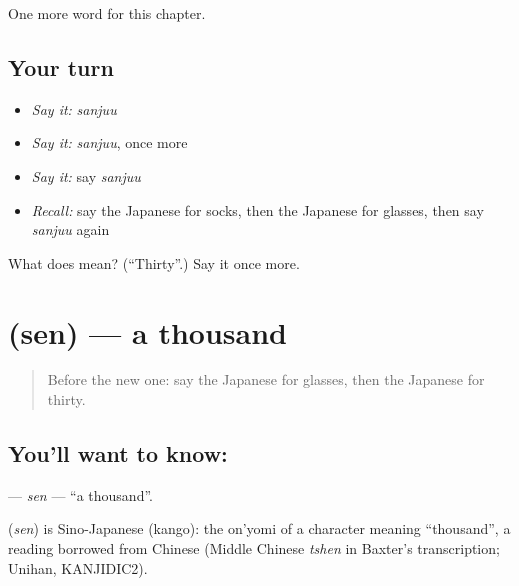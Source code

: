 \begin{grammarlens}[title={What you've built}]
One more word for this chapter.
\end{grammarlens}

\subsection*{Your turn}
\begin{itemize}
\raggedright
  \item \emph{Say it:} \emph{sanjuu}
  \item \emph{Say it:} \emph{sanjuu}, once more
  \item \emph{Say it:} say \emph{sanjuu}
  \item \emph{Recall:} say the Japanese for socks, then the Japanese for glasses, then say \emph{sanjuu} again
\end{itemize}

\begin{tcolorbox}[breakable,colback=teal!4,colframe=teal!35!black,title={Before you move on}]
What does  mean? (\textquotedblleft{}Thirty\textquotedblright{}.) Say it once more.
\end{tcolorbox}
\section[\texorpdfstring{\ja{せん} (sen)}{せん (sen)}]{ (sen) — a thousand}

\label{lesson:JA-C59-sen}



\begin{quote}
Before the new one: say the Japanese for glasses, then the Japanese for thirty.
\end{quote}

\subsection*{You'll want to know: }
\textbf{} — \emph{sen} — \textquotedblleft{}a thousand\textquotedblright{}.

\begin{cousinweb}
\textbf{} (\emph{sen}) is Sino-Japanese (kango): the on'yomi of a character meaning \textquotedblleft{}thousand\textquotedblright{}, a reading borrowed from Chinese (Middle Chinese \emph{tshen} in Baxter's transcription; Unihan, KANJIDIC2).
\end{cousinweb}


